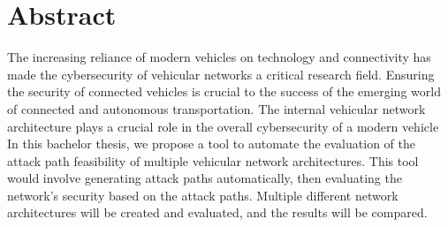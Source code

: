 
\chapter*{Abstract}\label{chp:abstract}

The increasing reliance of modern vehicles on technology and connectivity has made the cybersecurity of vehicular networks a critical research field. Ensuring the security of connected vehicles is crucial to the success of the emerging world of connected and autonomous transportation. The internal vehicular network architecture plays a crucial role in the overall cybersecurity of a modern vehicle\\

In this bachelor thesis, we propose a tool to automate the evaluation of the attack path feasibility of multiple vehicular network architectures. This tool would involve generating attack paths automatically, then evaluating the network's security based on the attack paths. Multiple different network architectures will be created and evaluated, and the results will be compared. 